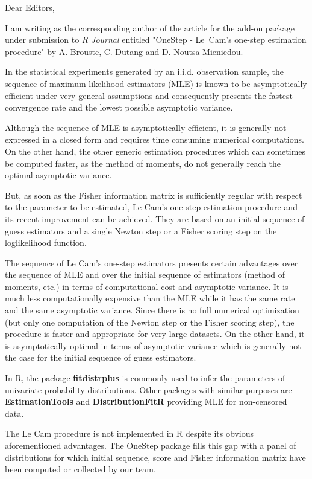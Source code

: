 \documentclass[11pt, a4paper,draft]{article}
\begin{document}
 

Dear Editors,

\vskip 12pt

I am writing as the corresponding author of the article for the add-on package under submission to {\it R Journal} 
entitled
"OneStep - Le~Cam's one-step estimation procedure" by A. Brouste, C. Dutang and D. Noutsa Mieniedou.

In the statistical experiments generated by an i.i.d. observation sample, the sequence of maximum likelihood estimators (MLE) is known to be asymptotically efficient under very general assumptions and consequently presents the fastest convergence rate and the lowest possible asymptotic variance.

Although the sequence of MLE is asymptotically efficient, it is generally not expressed in a closed form and requires time consuming numerical computations. On the other hand, the other generic estimation procedures which can sometimes be computed faster, as the method of moments, do not generally reach the optimal asymptotic variance.

But, as soon as the Fisher information matrix is sufficiently regular with respect to the parameter to be estimated, Le Cam's one-step estimation procedure \cite{LeCam} and its recent improvement \cite{Uchida} can be achieved. They are based on an initial sequence
of guess estimators and a single Newton step or a Fisher scoring step on the loglikelihood function. 

The sequence of Le Cam's one-step estimators presents certain advantages over the sequence of MLE and over the initial sequence of estimators (method of moments, etc.) in terms of computational cost and asymptotic variance. 
It is much less computationally expensive than the MLE while it has the same rate and the same asymptotic variance. 
Since there is no full numerical optimization (but only one computation of the Newton step or the Fisher scoring step), the procedure 
is faster and appropriate for very large datasets.
On the other hand, it is asymptotically  optimal in terms of asymptotic variance which is generally not 
the case for the initial sequence of guess estimators. 

In R,  the package {\bf fitdistrplus} is commonly used to infer the parameters 
of univariate probability distributions. Other packages with similar purposes are  {\bf EstimationTools} and {\bf DistributionFitR} 
providing MLE for non-censored data.

The Le Cam procedure is not implemented in R despite its obvious aforementioned advantages. The OneStep package fills this gap with a panel of distributions for which initial sequence, score and Fisher information matrix have been computed or collected by our team.
\end{document}
